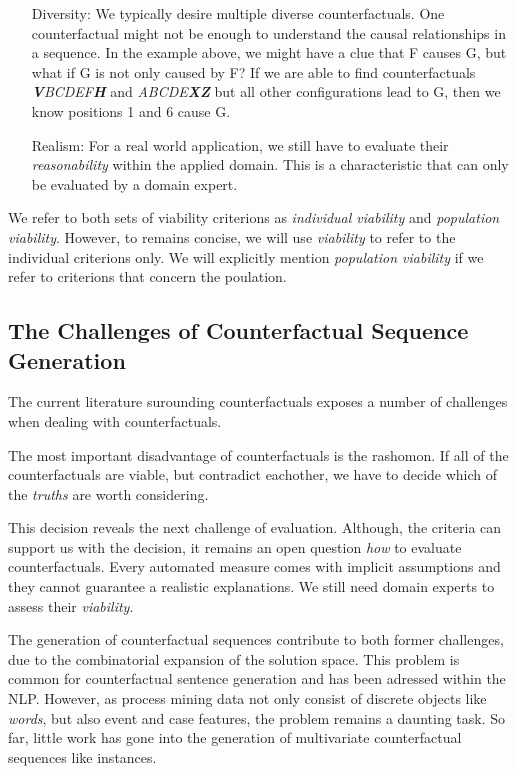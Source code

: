 \documentclass[./../../paper.tex]{subfiles}
\begin{document}
\begin{itemize}
    \item[Diversity:] We typically desire multiple diverse counterfactuals. One counterfactual might not be enough to understand the causal relationships in a sequence. In the example above, we might have a clue that F causes G, but what if G is not only caused by F? If we are able to find counterfactuals \textit{\textbf{V}BCDEF\textbf{H}} and \textit{ABCDE\textbf{XZ}} but all other configurations lead to G, then we know positions 1 and 6 cause G. 
    \item[Realism:] For a real world application, we still have to evaluate their \emph{reasonability} within the applied domain. This is a characteristic that can only be evaluated by a domain expert. 
\end{itemize}

We refer to both sets of viability criterions as \emph{individual viability} and \emph{population viability}. However, to remains concise, we will use \emph{viability} to refer to the individual criterions only. We will explicitly mention \emph{population viability} if we refer to criterions that concern the poulation.



\subsection{The Challenges of Counterfactual Sequence Generation}
The current literature surounding counterfactuals exposes a number of challenges when dealing with counterfactuals.

The most important disadvantage of counterfactuals is the \gls{rashomon}\autocite[ch.9.3]{molnar2019}. If all of the counterfactuals are viable, but contradict eachother, we have to decide which of the \emph{truths} are worth considering.

This decision reveals the next challenge of evaluation. Although, the criteria can support us with the decision, it remains an open question \emph{how} to evaluate counterfactuals. Every automated measure comes with implicit assumptions and they cannot guarantee a realistic explanations. We still need domain experts to assess their \emph{viability}.

The generation of counterfactual sequences contribute to both former challenges, due to the combinatorial expansion of the solution space. This problem is common for counterfactual sentence generation and has been adressed within the \gls{NLP}. However, as process mining data not only consist of discrete objects like \emph{words}, but also event and case features, the problem remains a daunting task. So far, little work has gone into the generation of multivariate counterfactual sequences like \glspl{instance}.


\end{document}
